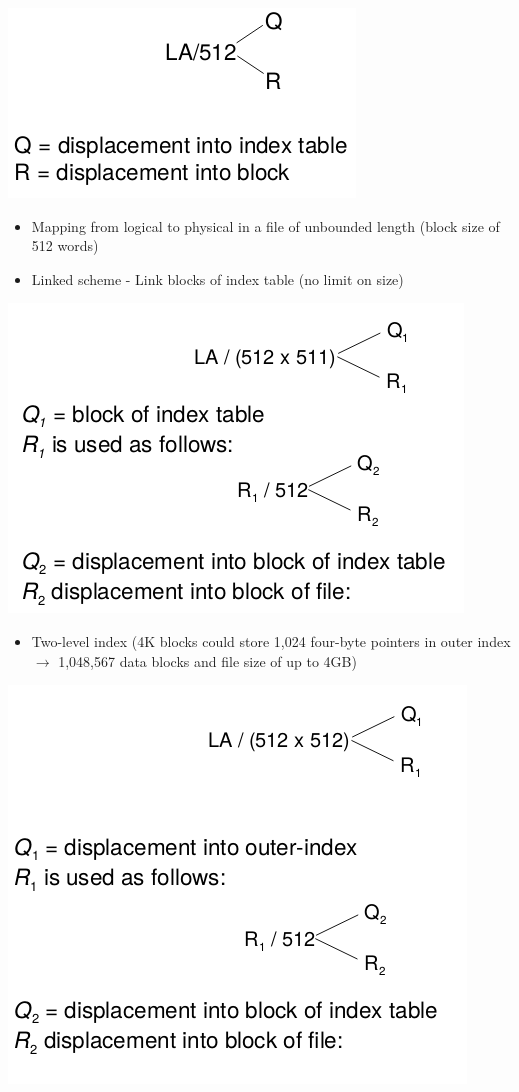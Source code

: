 \documentclass{article}[18pt]
\begin{document}
\begin{center}
	\includegraphics[scale=0.7]{index2}
\end{center}
\begin{itemize}
	\item Mapping from logical to physical in a file of unbounded length (block size of 512 words)
	\item Linked scheme - Link blocks of index table (no limit on size)
\end{itemize}
\begin{center}
	\includegraphics[scale=0.7]{index3}
\end{center}
\begin{itemize}
	\item Two-level index (4K blocks could store 1,024 four-byte pointers in outer index $\rightarrow$ 1,048,567 data blocks and file size of up to 4GB)
\end{itemize}
\begin{center}
	\includegraphics[scale=0.7]{index4}
\end{center}
\end{document}
